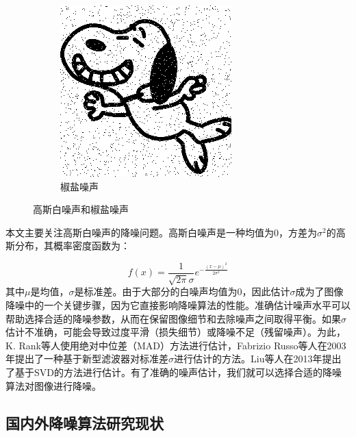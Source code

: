 \documentclass[12pt]{article}
\begin{document}
\begin{figure}[H]
\begin{subfigure}[b]{0.45\textwidth}
        \includegraphics[width=\textwidth]{images/salt_pepper_noise.png}
        \caption{椒盐噪声}
    \end{subfigure}
    \caption{高斯白噪声和椒盐噪声}
    \label{fig:noise_types}
\end{figure}

本文主要关注高斯白噪声的降噪问题。高斯白噪声是一种均值为0，方差为$\sigma^2$的高斯分布，其概率密度函数为：

\begin{equation}
    f(x)=\frac{1}{\sqrt{2\pi}\sigma}e^{-\frac{(x - \mu)^{2}}{2\sigma^{2}}}
\end{equation}
其中$\mu$是均值，$\sigma$是标准差。由于大部分的白噪声均值为0，因此估计$\sigma$成为了图像降噪中的一个关键步骤，因为它直接影响降噪算法的性能。准确估计噪声水平可以帮助选择合适的降噪参数，从而在保留图像细节和去除噪声之间取得平衡。如果$\sigma$估计不准确，可能会导致过度平滑（损失细节）或降噪不足（残留噪声）\cite{Estimation_of_noise_variance}。为此，K. Rank等人\cite{MADestimate}使用绝对中位差（MAD）方法进行估计，Fabrizio Russo等人\cite{AWGN}在2003年提出了一种基于新型滤波器对标准差$\sigma$进行估计的方法。Liu等人在2013年提出了基于SVD的方法\cite{SVDWhiteNoise}进行估计。有了准确的噪声估计，我们就可以选择合适的降噪算法对图像进行降噪。

\subsection{国内外降噪算法研究现状}
\end{document}
